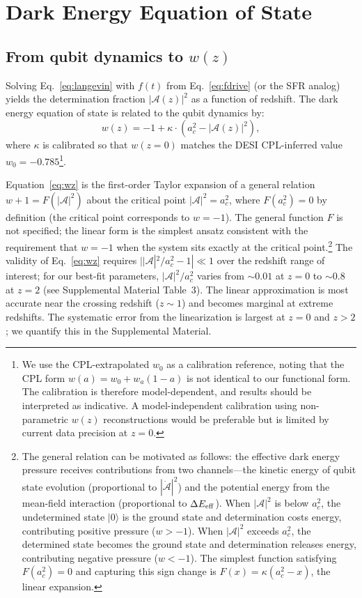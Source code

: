 \documentclass[aps,prd,twocolumn,superscriptaddress]{revtex4-2}
\begin{document}
\section{Dark Energy Equation of State}
\label{sec:darkenergy}

\subsection{From qubit dynamics to $w(z)$}

Solving Eq.~\eqref{eq:langevin} with $f(t)$ from Eq.~\eqref{eq:fdrive} (or the SFR analog) yields the determination fraction $|\mathcal{A}(z)|^2$ as a function of redshift. The dark energy equation of state is related to the qubit dynamics by:
\begin{equation}
w(z) = -1 + \kappa \cdot \left(a_c^2 - |\mathcal{A}(z)|^2\right),
\label{eq:wz}
\end{equation}
where $\kappa$ is calibrated so that $w(z=0)$ matches the DESI CPL-inferred value $w_0 = -0.785$\footnote{We use the CPL-extrapolated $w_0$ as a calibration reference, noting that the CPL form $w(a) = w_0 + w_a(1-a)$ is not identical to our functional form. The calibration is therefore model-dependent, and results should be interpreted as indicative. A model-independent calibration using non-parametric $w(z)$ reconstructions would be preferable but is limited by current data precision at $z=0$.}.

Equation~\eqref{eq:wz} is the first-order Taylor expansion of a general relation $w+1 = F(|\mathcal{A}|^2)$ about the critical point $|\mathcal{A}|^2 = a_c^2$, where $F(a_c^2)=0$ by definition (the critical point corresponds to $w=-1$). The general function $F$ is not specified; the linear form is the simplest ansatz consistent with the requirement that $w=-1$ when the system sits exactly at the critical point.\footnote{The general relation can be motivated as follows: the effective dark energy pressure receives contributions from two channels---the kinetic energy of qubit state evolution (proportional to $|\dot{\mathcal{A}}|^2$) and the potential energy from the mean-field interaction (proportional to $\Delta E_{\rm eff}$). When $|\mathcal{A}|^2$ is below $a_c^2$, the undetermined state $|0\rangle$ is the ground state and determination costs energy, contributing positive pressure ($w > -1$). When $|\mathcal{A}|^2$ exceeds $a_c^2$, the determined state becomes the ground state and determination releases energy, contributing negative pressure ($w < -1$). The simplest function satisfying $F(a_c^2)=0$ and capturing this sign change is $F(x) = \kappa(a_c^2 - x)$, the linear expansion.} The validity of Eq.~\eqref{eq:wz} requires $||\mathcal{A}|^2/a_c^2 - 1| \ll 1$ over the redshift range of interest; for our best-fit parameters, $|\mathcal{A}|^2/a_c^2$ varies from $\sim 0.01$ at $z=0$ to $\sim 0.8$ at $z=2$ (see Supplemental Material Table~3). The linear approximation is most accurate near the crossing redshift ($z \sim 1$) and becomes marginal at extreme redshifts. The systematic error from the linearization is largest at $z=0$ and $z > 2$; we quantify this in the Supplemental Material.
\end{document}
